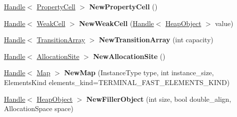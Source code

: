 \begin{DoxyCompactItemize}
\item 
\hyperlink{classv8_1_1internal_1_1_handle}{Handle}$<$ \hyperlink{classv8_1_1internal_1_1_property_cell}{Property\+Cell} $>$ {\bfseries New\+Property\+Cell} ()\hypertarget{classv8_1_1internal_1_1_factory_addf52c05ea7a296d9cd524061ae03490}{}\label{classv8_1_1internal_1_1_factory_addf52c05ea7a296d9cd524061ae03490}

\item 
\hyperlink{classv8_1_1internal_1_1_handle}{Handle}$<$ \hyperlink{classv8_1_1internal_1_1_weak_cell}{Weak\+Cell} $>$ {\bfseries New\+Weak\+Cell} (\hyperlink{classv8_1_1internal_1_1_handle}{Handle}$<$ \hyperlink{classv8_1_1internal_1_1_heap_object}{Heap\+Object} $>$ value)\hypertarget{classv8_1_1internal_1_1_factory_ad9a1cee7652546786da859f77f6c0241}{}\label{classv8_1_1internal_1_1_factory_ad9a1cee7652546786da859f77f6c0241}

\item 
\hyperlink{classv8_1_1internal_1_1_handle}{Handle}$<$ \hyperlink{classv8_1_1internal_1_1_transition_array}{Transition\+Array} $>$ {\bfseries New\+Transition\+Array} (int capacity)\hypertarget{classv8_1_1internal_1_1_factory_a1374f0972e4d7cf4b1204c542649073c}{}\label{classv8_1_1internal_1_1_factory_a1374f0972e4d7cf4b1204c542649073c}

\item 
\hyperlink{classv8_1_1internal_1_1_handle}{Handle}$<$ \hyperlink{classv8_1_1internal_1_1_allocation_site}{Allocation\+Site} $>$ {\bfseries New\+Allocation\+Site} ()\hypertarget{classv8_1_1internal_1_1_factory_ad34fbab3a1ef849652a10bbf252cb134}{}\label{classv8_1_1internal_1_1_factory_ad34fbab3a1ef849652a10bbf252cb134}

\item 
\hyperlink{classv8_1_1internal_1_1_handle}{Handle}$<$ \hyperlink{classv8_1_1internal_1_1_map}{Map} $>$ {\bfseries New\+Map} (Instance\+Type type, int instance\+\_\+size, Elements\+Kind elements\+\_\+kind=T\+E\+R\+M\+I\+N\+A\+L\+\_\+\+F\+A\+S\+T\+\_\+\+E\+L\+E\+M\+E\+N\+T\+S\+\_\+\+K\+I\+ND)\hypertarget{classv8_1_1internal_1_1_factory_a04cbb48e0e146f1bf30392e564688a6c}{}\label{classv8_1_1internal_1_1_factory_a04cbb48e0e146f1bf30392e564688a6c}

\item 
\hyperlink{classv8_1_1internal_1_1_handle}{Handle}$<$ \hyperlink{classv8_1_1internal_1_1_heap_object}{Heap\+Object} $>$ {\bfseries New\+Filler\+Object} (int size, bool double\+\_\+align, Allocation\+Space space)\hypertarget{classv8_1_1internal_1_1_factory_a0061aebd55bf01be9a850aaf45ddf4d5}{}\label{classv8_1_1internal_1_1_factory_a0061aebd55bf01be9a850aaf45ddf4d5}


\end{DoxyCompactItemize}
